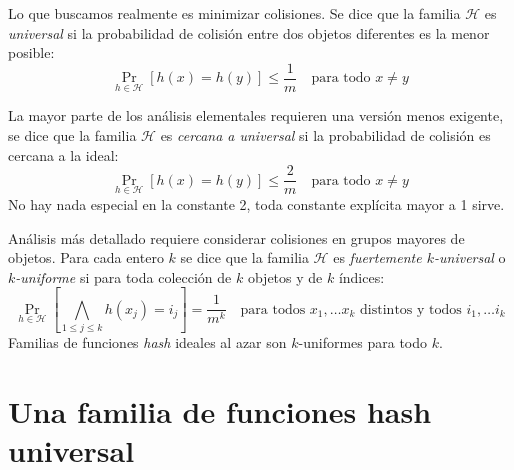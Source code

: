   Lo que buscamos realmente es minimizar colisiones.
  Se dice que la familia \(\mathscr{H}\) es \emph{universal}
  si la probabilidad de colisión entre dos objetos diferentes
  es la menor posible:
  \begin{equation}
    \label{eq:hash-universal}
    \Pr_{h \in \mathscr{H}}[ h(x) = h(y) ]
      \le \frac{1}{m}
      \quad\text{para todo \(x \ne y\)}
  \end{equation}

  La mayor parte de los análisis elementales
  requieren una versión menos exigente,
  se dice que la familia \(\mathscr{H}\)
  es \emph{cercana a universal}
  si la probabilidad de colisión es cercana a la ideal:
  \begin{equation}
    \label{eq:hash-near-universal}
    \Pr_{h \in \mathscr{H}}[ h(x) = h(y) ]
      \le \frac{2}{m}
      \quad\text{para todo \(x \ne y\)}
  \end{equation}
  No hay nada especial en la constante \num{2},
  toda constante explícita mayor a \num{1} sirve.

  Análisis más detallado
  requiere considerar colisiones en grupos mayores de objetos.
  Para cada entero \(k\) se dice que la familia \(\mathscr{H}\)
  es \emph{fuertemente \(k\)\nobreakdash-universal}
  o \emph{\(k\)\nobreakdash-uniforme}
  si para toda colección de \(k\) objetos y de \(k\) índices:
  \begin{equation}
    \label{eq:hash-k-uniform}
    \Pr_{h \in \mathscr{H}}
       \left[
         \bigwedge_{1 \le j \le k} h(x_j) = i_j
       \right]
       = \frac{1}{m^k}
      \quad\text{para todos \(x_1, \dotsc x_k\) distintos
                 y todos \(i_1, \dotsc i_k\)}
  \end{equation}
  Familias de funciones \emph{\foreignlanguage{english}{hash}} ideales al azar
  son \(k\)\nobreakdash-uniformes para todo \(k\).

\section{Una familia de funciones hash universal}
\label{sec:familia-hash-universal}

